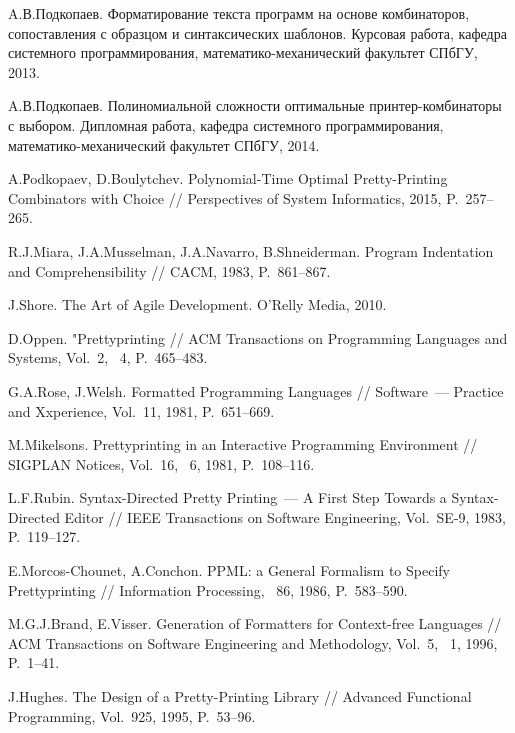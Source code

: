 \begin{thebibliography}{99}
  A.В.Подкопаев. Форматирование текста программ на основе комбинаторов, сопоставления с 
  образцом и синтаксических шаблонов. Курсовая работа, кафедра системного программирования, 
  математико-механический факультет СПбГУ, 2013.

  A.В.Подкопаев. Полиномиальной сложности оптимальные принтер-комбинаторы с выбором.
  Дипломная работа, кафедра системного программирования, математико-механический факультет СПбГУ, 2014.

  A.Рodkopaev, D.Boulytchev. Polynomial-Time Optimal Pretty-Printing Combinators with Choice //
  Perspectives of System Informatics, 2015, P.~257--265.

    R.J.Miara, J.A.Musselman, J.A.Navarro, B.Shneiderman. Program Indentation and Comprehensibility //
    CACM, 1983, P.~861--867.

    J.Shore. The Art of Agile Development. O’Relly Media, 2010.

    D.Oppen. "Prettyprinting // ACM Transactions on Programming Languages and Systems,
    Vol.~2, \textnumero~4, P.~465--483.

    G.A.Rose, J.Welsh. Formatted Programming Languages // Software~--- Practice and Xxperience,
    Vol.~11, 1981, P.~651--669.

    M.Mikelsons. Prettyprinting in an Interactive Programming Environment //
    SIGPLAN Notices, Vol.~16, \textnumero~6, 1981, P.~108--116.

    L.F.Rubin. Syntax-Directed Pretty Printing~--- A First Step Towards a Syntax-Directed Editor //
    IEEE Transactions on Software Engineering, Vol.~SE-9, 1983, P.~119--127.

    E.Morcos-Chounet, A.Conchon. PPML: a General Formalism to Specify Prettyprinting //
    Information Processing, \textnumero~86, 1986, P.~583--590.

    M.G.J.Brand, E.Visser. Generation of Formatters for Context-free Languages //
    ACM Transactions on Software Engineering and Methodology, Vol.~5, \textnumero~1, 1996,
    P.~1--41.

    J.Hughes. The Design of a Pretty-Printing Library // Advanced Functional Programming,
    Vol.~925, 1995, P.~53--96.


\end{thebibliography}
